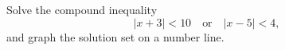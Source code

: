 Solve the compound inequality
\[|x+3|<10\quad\text{or}\quad|x-5|<4,\]
and graph the solution set on a number line.
